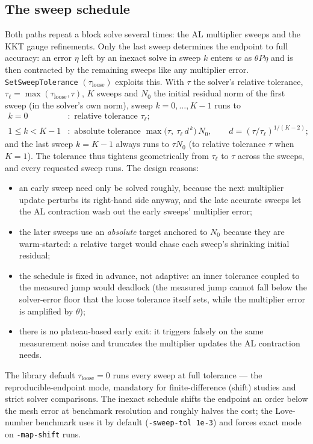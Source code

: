 \documentclass[11pt]{article}
\begin{document}
\subsection{The sweep schedule}
\label{sec:sweeps}

Both paths repeat a block solve several times: the AL multiplier sweeps
and the KKT gauge refinements. Only the last sweep determines the
endpoint to full accuracy: an error $\eta$ left by an inexact solve in
sweep $k$ enters $w$ as $\theta P\eta$ and is then contracted by the
remaining sweeps like any multiplier error. \texttt{SetSweepTolerance}
$(\tau_{\mathrm{loose}})$ exploits this. With $\tau$ the solver's
relative tolerance, $\tau_\ell = \max(\tau_{\mathrm{loose}},\tau)$, $K$
sweeps and $N_0$ the initial residual norm of the first sweep (in the
solver's own norm), sweep $k = 0,\dots,K-1$ runs to
\begin{align}
  k = 0&: \text{ relative tolerance } \tau_\ell; \nonumber\\
  1\le k<K-1&: \text{ absolute tolerance }
    \max\bigl(\tau,\ \tau_\ell\,d^{\,k}\bigr)\,N_0,
  \qquad d = (\tau/\tau_\ell)^{1/(K-2)};
\end{align}
and the last sweep $k = K-1$ always runs to $\tau N_0$ (to relative
tolerance $\tau$ when $K = 1$). The tolerance thus tightens
geometrically from $\tau_\ell$ to $\tau$ across the sweeps, and every
requested sweep runs. The design reasons:
\begin{itemize}
\item an early sweep need only be solved roughly, because the next
  multiplier update perturbs its right-hand side anyway, and the late
  accurate sweeps let the AL contraction wash out the early sweeps'
  multiplier error;
\item the later sweeps use an \emph{absolute} target anchored to $N_0$
  because they are warm-started: a relative target would chase each
  sweep's shrinking initial residual;
\item the schedule is fixed in advance, not adaptive: an inner
  tolerance coupled to the measured jump would deadlock (the measured
  jump cannot fall below the solver-error floor that the loose
  tolerance itself sets, while the multiplier error is amplified by
  $\theta$);
\item there is no plateau-based early exit: it triggers falsely on the
  same measurement noise and truncates the multiplier updates the AL
  contraction needs.
\end{itemize}
The library default $\tau_{\mathrm{loose}} = 0$ runs every sweep at full
tolerance --- the reproducible-endpoint mode, mandatory for
finite-difference (shift) studies and strict solver comparisons. The
inexact schedule shifts the endpoint an order below the mesh error at
benchmark resolution and roughly halves the cost; the Love-number
benchmark uses it by default (\texttt{-sweep-tol 1e-3}) and forces exact
mode on \texttt{-map-shift} runs.
\end{document}
